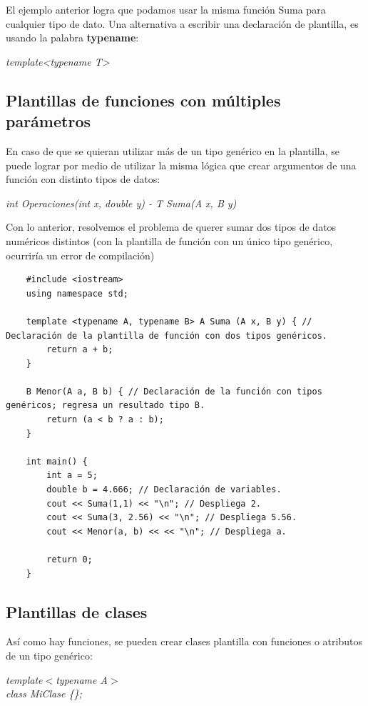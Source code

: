 El ejemplo anterior logra que podamos usar la misma función Suma para cualquier tipo de dato. Una alternativa a escribir una declaración de plantilla, es usando la palabra \textbf{typename}:
\begin{center}
	\textit{template<typename T>}
\end{center}


\subsection{Plantillas de funciones con múltiples parámetros}
\hspace{0.55cm}En caso de que se quieran utilizar más de un tipo genérico en la plantilla, se puede lograr por medio de utilizar la misma lógica que crear argumentos de una función con distinto tipos de datos:
\begin{center}
	\textit{int Operaciones(int x, double y) - T Suma(A x, B y)}
\end{center}

Con lo anterior, resolvemos el problema de querer sumar dos tipos de datos numéricos distintos (con la plantilla de función con un único tipo genérico, ocurriría un error de compilación)
\begin{lstlisting}
    #include <iostream>
    using namespace std;
    
    template <typename A, typename B> A Suma (A x, B y) { // Declaración de la plantilla de función con dos tipos genéricos.
        return a + b;
    }
    
    B Menor(A a, B b) { // Declaración de la función con tipos genéricos; regresa un resultado tipo B.
        return (a < b ? a : b);
    }
    
    int main() {
        int a = 5;
        double b = 4.666; // Declaración de variables.
        cout << Suma(1,1) << "\n"; // Despliega 2.
        cout << Suma(3, 2.56) << "\n"; // Despliega 5.56.
        cout << Menor(a, b) << << "\n"; // Despliega a.
        
        return 0;
    }
\end{lstlisting}


\subsection{Plantillas de clases}
\hspace{0.55cm}Así como hay funciones, se pueden crear clases plantilla con funciones o atributos de un tipo genérico:
\begin{center}
	\textit{
		template$<$typename A$>$ \\
		class MiClase \{\};
	}
\end{center}

